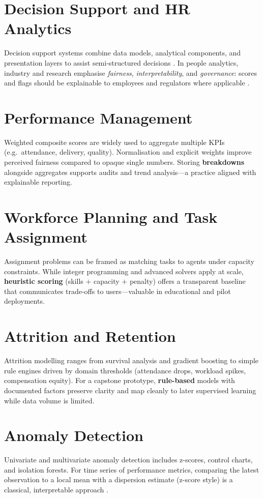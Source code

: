 \section{Decision Support and HR Analytics}
Decision support systems combine data models, analytical components, and presentation layers to assist semi-structured decisions \cite{power2002}. In people analytics, industry and research emphasise \emph{fairness}, \emph{interpretability}, and \emph{governance}: scores and flags should be explainable to employees and regulators where applicable \cite{barocas2019,deloitte2018people}.

\section{Performance Management}
Weighted composite scores are widely used to aggregate multiple KPIs (e.g.\ attendance, delivery, quality). Normalisation and explicit weights improve perceived fairness compared to opaque single numbers. Storing \textbf{breakdowns} alongside aggregates supports audits and trend analysis---a practice aligned with explainable reporting.

\section{Workforce Planning and Task Assignment}
Assignment problems can be framed as matching tasks to agents under capacity constraints. While integer programming and advanced solvers apply at scale, \textbf{heuristic scoring} (skills $+$ capacity $+$ penalty) offers a transparent baseline that communicates trade-offs to users---valuable in educational and pilot deployments.

\section{Attrition and Retention}
Attrition modelling ranges from survival analysis and gradient boosting to simple rule engines driven by domain thresholds (attendance drops, workload spikes, compensation equity). For a capstone prototype, \textbf{rule-based} models with documented factors preserve clarity and map cleanly to later supervised learning while data volume is limited.

\section{Anomaly Detection}
Univariate and multivariate anomaly detection includes z-scores, control charts, and isolation forests. For time series of performance metrics, comparing the latest observation to a local mean with a dispersion estimate (z-score style) is a classical, interpretable approach \cite{chandola2009}.

